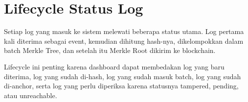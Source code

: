 \dataflowdiagram

\section{Lifecycle Status Log}

Setiap log yang masuk ke sistem melewati beberapa status utama. Log pertama kali diterima sebagai event, kemudian dihitung hash-nya, dikelompokkan dalam batch Merkle Tree, dan setelah itu Merkle Root dikirim ke blockchain.

\lifecyclediagram

Lifecycle ini penting karena dashboard dapat membedakan log yang baru diterima, log yang sudah di-hash, log yang sudah masuk batch, log yang sudah di-anchor, serta log yang perlu diperiksa karena statusnya tampered, pending, atau unreachable.
